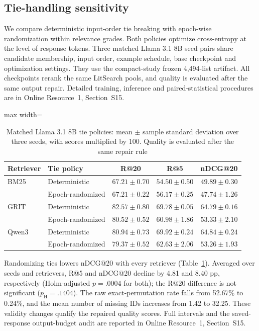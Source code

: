\documentclass[pdflatex,sn-basic,Numbered]{sn-jnl}%
\theoremstyle{thmstyleone}%
\theoremstyle{thmstyletwo}%
\theoremstyle{thmstylethree}%
\begin{document}
\subsection{Tie-handling sensitivity}
\label{sec:tie-sensitivity}
We compare deterministic input-order tie breaking with epoch-wise randomization
within relevance grades. Both policies optimize cross-entropy at the level of response tokens.
Three matched Llama 3.1 8B seed pairs share candidate membership, input order,
example schedule, base checkpoint and optimization settings. They use the
compact-study frozen 4,494-list artifact. All checkpoints rerank the same LitSearch pools, and
quality is evaluated after the same output repair. Detailed training, inference
and paired-statistical procedures are in Online Resource~1, Section~S15.

\begin{table}[ht]


\centering
\footnotesize
\setlength{\tabcolsep}{4pt}
\renewcommand{\arraystretch}{1.08}
\begin{adjustbox}{max width=\linewidth}
\begin{tabular}{l l c c c}
\hline
Retriever & Tie policy & R@20 & R@5 & nDCG@20 \\
\hline
BM25 & Deterministic & $67.21\pm0.70$ & $54.50\pm0.50$ & $49.89\pm0.30$ \\
     & Epoch-randomized & $67.21\pm0.22$ & $56.17\pm0.25$ & $47.74\pm1.26$ \\
\hline
GRIT & Deterministic & $82.57\pm0.80$ & $69.78\pm0.05$ & $64.79\pm0.16$ \\
     & Epoch-randomized & $80.52\pm0.52$ & $60.98\pm1.86$ & $53.33\pm2.10$ \\
\hline
Qwen3 & Deterministic & $80.94\pm0.73$ & $69.92\pm0.24$ & $64.84\pm0.24$ \\
      & Epoch-randomized & $79.37\pm0.52$ & $62.63\pm2.06$ & $53.26\pm1.93$ \\
\hline
\end{tabular}
\end{adjustbox}


\caption{Matched Llama 3.1 8B tie policies: mean $\pm$ sample standard deviation over three seeds, with scores multiplied by 100. Quality is evaluated after the same repair rule}
\label{tab:tie-sensitivity}
\end{table}

Randomizing ties lowers nDCG@20 with every retriever
(Table~\ref{tab:tie-sensitivity}). Averaged over seeds and retrievers, R@5 and
nDCG@20 decline by 4.81 and 8.40 pp, respectively (Holm-adjusted $p=.0004$
for both); the R@20 difference is not significant ($p_{\mathrm H}=.1404$).
The raw exact-permutation rate falls from 52.67\% to 0.24\%, and the mean number of missing
IDs increases from 1.42 to 32.25. These validity changes qualify the repaired
quality scores. Full intervals and the saved-response output-budget audit are
reported in Online Resource~1, Section~S15.
\end{document}
